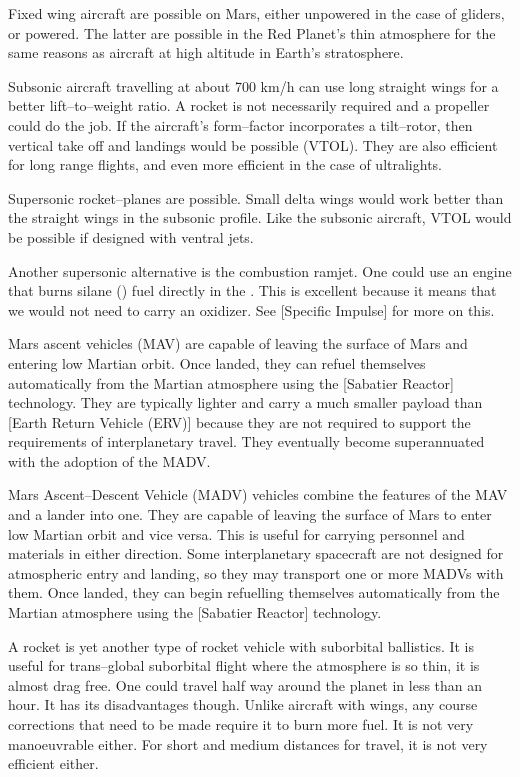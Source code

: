 Fixed wing aircraft are possible on Mars, either unpowered in the case of gliders, or powered. The latter are possible in the Red Planet's thin atmosphere for the same reasons as aircraft at high altitude in Earth's stratosphere.

Subsonic aircraft travelling at about 700 km/h can use long straight wings for a better lift--to--weight ratio. A rocket is not necessarily required and a propeller could do the job. If the aircraft's form--factor incorporates a tilt--rotor, then vertical take off and landings would be possible (VTOL). They are also efficient for long range flights, and even more efficient in the case of ultralights.

Supersonic rocket--planes are possible. Small delta wings would work better than the straight wings in the subsonic profile. Like the subsonic aircraft, VTOL would be possible if designed with ventral jets.

Another supersonic alternative is the combustion ramjet. One could use an engine that burns silane () fuel directly in the . This is excellent because it means that we would not need to carry an oxidizer. See [Specific Impulse] for more on this.

Mars ascent vehicles (MAV) are capable of leaving the surface of Mars and entering low Martian orbit. Once landed, they can refuel themselves automatically from the Martian atmosphere using the [Sabatier Reactor] technology. They are typically lighter and carry a much smaller payload than [Earth Return Vehicle (ERV)] because they are not required to support the requirements of interplanetary travel. They eventually become superannuated with the adoption of the MADV.

Mars Ascent--Descent Vehicle (MADV) vehicles combine the features of the MAV and a lander into one. They are capable of leaving the surface of Mars to enter low Martian orbit and vice versa. This is useful for carrying personnel and materials in either direction. Some interplanetary spacecraft are not designed for atmospheric entry and landing, so they may transport one or more MADVs with them. Once landed, they can begin refuelling themselves automatically from the Martian atmosphere using the [Sabatier Reactor] technology.

A rocket  is yet another type of rocket vehicle with suborbital ballistics. It is useful for trans--global suborbital flight where the atmosphere is so thin, it is almost drag free. One could travel half way around the planet in less than an hour. It has its disadvantages though. Unlike aircraft with wings, any course corrections that need to be made require it to burn more fuel. It is not very manoeuvrable either. For short and medium distances for travel, it is not very efficient either.

